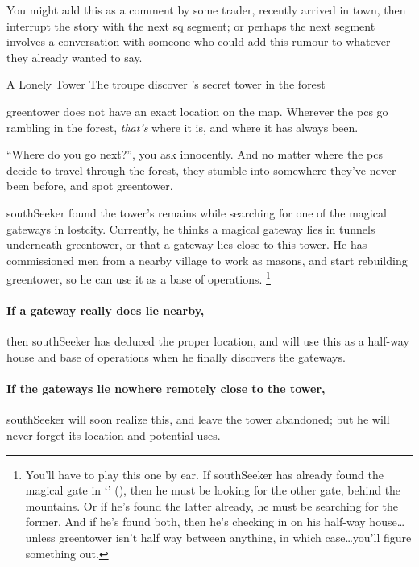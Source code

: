 You might add this as a comment by some trader, recently arrived in town, then interrupt the story with the next \gls{sq} \gls{segment}; or perhaps the next \gls{segment} involves a conversation with someone who could add this rumour to whatever they already wanted to say.

{A Lonely Tower}%
{The troupe discover 's secret tower in the forest}%

\label{green_tower_sq}

\Gls{greentower} does not have an exact location on the map.
Wherever the \glspl{pc} go \gls{rambling} in the forest, \textit{that's} where it is, and where it has always been.

``Where do you go next?'', you ask innocently.
And no matter where the \glspl{pc} decide to travel through the forest, they stumble into somewhere they've never been before, and spot \gls{greentower}.

\begin{exampletext}
  \Gls{southSeeker} found the tower's remains while searching for one of the magical gateways in \gls{lostcity}.
  Currently, he thinks a magical gateway lies in tunnels underneath \gls{greentower}, or that a gateway lies close to this tower.
  He has commissioned men from a nearby \gls{village} to work as masons, and start rebuilding \gls{greentower}, so he can use it as a base of operations.%
  \footnote{You'll have to play this one by ear.
  If \gls{southSeeker} has already found the magical gate in `' (), then he must be looking for the other gate, behind the mountains.
  Or if he's found the latter already, he must be searching for the former.
  And if he's found both, then he's checking in on his half-way house\ldots unless \gls{greentower} isn't half way between anything, in which case\ldots you'll figure something out.}
\end{exampletext}

\paragraph{If a gateway really does lie nearby,}
then \gls{southSeeker} has deduced the proper location, and will use this as a half-way house and base of operations when he finally discovers the gateways.

\paragraph{If the gateways lie nowhere remotely close to the tower,}
\gls{southSeeker} will soon realize this, and leave the tower abandoned; but he will never forget its location and potential uses.

